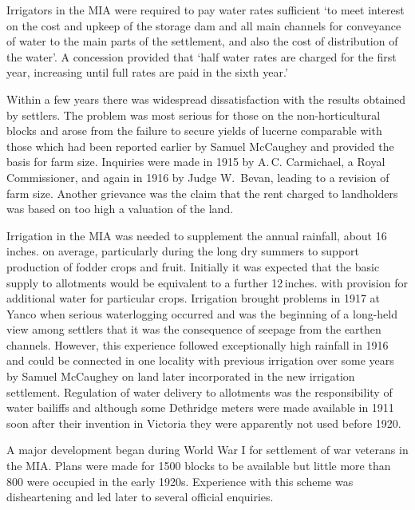 Irrigators in the MIA were required to pay water rates sufficient `to
meet interest on the cost and upkeep of the storage dam and all main
channels for conveyance of water to the main parts of the settlement,
and also the cost of distribution of the water'. A concession provided
that `half water rates are charged for the first year, increasing
until full rates are paid in the sixth year.'

Within a few years there was widespread dissatisfaction with the
results obtained by settlers.  The problem was most serious for those
on the non-horticultural blocks and arose from the failure to secure
yields of lucerne comparable with those which had been reported
earlier by Samuel McCaughey and provided the basis for farm size.
Inquiries were made in 1915 by A.\,C. Carmichael, a Royal
Commissioner, and again in 1916 by Judge W.~Bevan, leading to a
revision of farm size.  Another grievance was the claim that the rent
charged to landholders was based on too high a valuation of the
land.

Irrigation in the MIA was needed to supplement the annual rainfall,
about 16\,inches. on average, particularly during the long dry summers
to support production of fodder crops and fruit.  Initially it was
expected that the basic supply to allotments would be equivalent to a
further 12\,inches. with provision for additional water for particular
crops. Irrigation brought problems in 1917 at Yanco when serious
waterlogging  occurred and was the beginning of a
long-held view among settlers that it was the consequence of seepage
from the earthen channels.  However, this experience followed
exceptionally high rainfall in 1916 and could be connected in one
locality with previous irrigation over some years by Samuel McCaughey
on land later incorporated in the new irrigation settlement.
Regulation of water delivery to allotments was the responsibility of
water bailiffs and although some Dethridge meters
 were made available
in 1911 soon after their invention in Victoria they were apparently
not used before 1920.

A major development began during World War I for settlement of war
veterans in the MIA.  Plans were made for 1500 blocks to be available
but little more than 800 were occupied in the early 1920s.  Experience
with this scheme was disheartening and led later to several official
enquiries.

